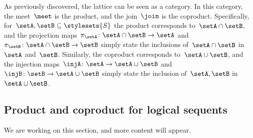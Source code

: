 \begin{figure}[h]
  \begin{center}
  \end{center}
  \caption{}
  \label{fig:prod_coprod_power}
\end{figure}
As previously discovered, the lattice can be seen as a category.
In this category, the meet~$\meet$ is the product, and the join~$\join$ is the coproduct.
Specifically, for~$\setA,\setB\subseteq \stylesets{S}$ the product corresponds to~$\setA\cap \setB$, and the projection maps~$\pi_\setA\colon \setA\cap \setB\to \setA$ and~$\pi_\setB\colon \setA\cap \setB\to \setB$ simply state the inclusions of~$\setA\cap \setB$ in~$\setA$ and~$\setB$.
Similarly, the coproduct corresponds to~$\setA\cup \setB$, and the injection maps~$\injA\colon \setA\to \setA\cup \setB$ and~$\injB\colon \setB\to \setA\cup \setB$ simply state the inclusion of~$\setA,\setB$ in~$\setA\cup \setB$.

\subsection{Product and coproduct for logical sequents}
\begin{publictodo}We are working on this section, and more content will appear.\end{publictodo}


